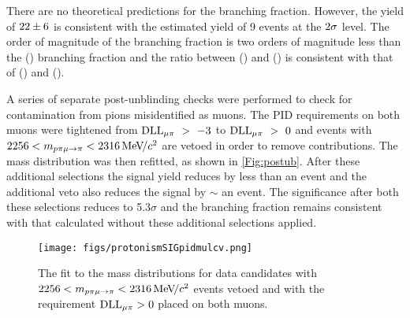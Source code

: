There are no theoretical predictions for the \Lbpi branching fraction. However, the yield of $22\pm6$ is consistent with the estimated yield of 9 events at the $2\sigma$ level. The order of magnitude of the \Lbpi branching fraction is two orders of magnitude less than the \Lb\to\proton\pim\jpsi(\to\mumu) branching fraction and the ratio between \BF(\Lbpi) and \BF(\Lbpijpsi) is consistent with that of \BF(\LbL) and \BF(\Lb\to\Lz\jpsi).

A series of separate post-unblinding checks were performed to check for contamination from pions misidentified as muons. The PID requirements on both muons were tightened from $\mathrm{DLL}_{{\mu}\pi}~>~-3$ to $\mathrm{DLL}_{{\mu}\pi}~>~0$ and events with $2256<m_{p\pi\mu\rightarrow\pi}<2316{\mathrm{\,Me\kern -0.1em V\!/}c^2}$ are vetoed in order to remove \Lc contributions. The \Lbpi mass distribution was then refitted, as shown in \autoref{Fig:postub}. After these additional \dllmupi selections the signal yield reduces by less than an event and the additional \Lc veto also reduces the signal by $\sim$ an event.  The significance after both these selections reduces to 5.3$\sigma$ and the branching fraction remains consistent with that calculated without these additional selections applied.

\begin{figure}[h!]
  \def\nh{0.7\textwidth}
  \centering
  \texttt{[image: figs/protonismSIGpidmulcv.png]}%
  \caption{The fit to the \Lbpi mass distributions for data candidates with $2256<m_{p\pi\mu\rightarrow\pi}<2316{\mathrm{\,Me\kern -0.1em V\!/}c^2}$ events vetoed and with the requirement $\mathrm{DLL}_{{\mu}\pi}>0$ placed on both muons.}
  \label{Fig:postub}
\end{figure}







